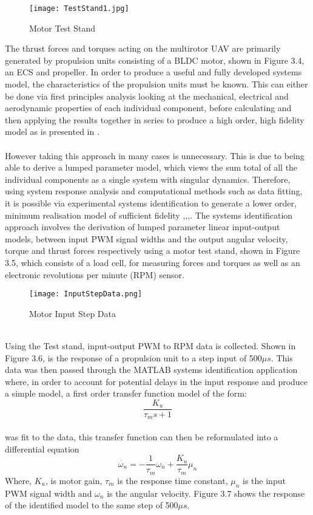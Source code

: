 \documentclass[12pt,a4paper,twoside]{report}
\begin{document}
			\begin{figure}[h!]
				\centering
				\texttt{[image: TestStand1.jpg]}
				\caption{Motor Test Stand}
				\label{fig:motorteststand}
			\end{figure}
				
			The thrust forces and torques acting on the multirotor UAV are primarily generated by propulsion units consisting of a BLDC motor, shown in Figure 3.4, an ECS and propeller. In order to produce a useful and fully developed systems model, the characteristics of the propulsion units must be known. This can either be done via first principles analysis looking at the mechanical, electrical and aerodynamic properties of each individual component, before calculating and then applying the results together in series to produce a high order, high fidelity model as is presented in \cite{17}. 
			\\ \\
			However taking this approach in many cases is unnecessary. This is due to being able to derive a lumped parameter model, which views the sum total of all the individual components as a single system with singular dynamics. Therefore, using system response analysis and computational methods such as data fitting, it is possible via experimental systems identification to generate a lower order, minimum realisation model of sufficient fidelity \cite{9},\cite{12},\cite{15},\cite{16}. The systems identification approach involves the derivation of lumped parameter linear input-output models, between input PWM signal widths and the output angular velocity, torque and thrust forces respectively using a motor test stand, shown in Figure 3.5, which consists of a load cell, for measuring forces and torques as well as an electronic revolutions per minute (RPM) sensor.
			\\
			\begin{figure}[h!]
				\centering
				\texttt{[image: InputStepData.png]}
				\caption{Motor Input Step Data}
				\label{fig:inputstepdata}
			\end{figure}
			\\
			Using the Test stand, input-output PWM to RPM data is collected. Shown in Figure 3.6, is the response of a propulsion unit to a step input of 500$\mu s$. This data was then passed through the MATLAB systems identification application where, in order to account for potential delays in the input response and produce a simple model, a first order transfer function model of the form:
			\\
			\[ \frac{K_u}{\tau_m s + 1} \]
			\\
			was fit to the data, this transfer function can then be reformulated into a differential equation
			\begin{equation}
				\dot{\omega_n} = -\frac{1}{\tau_m}\omega_n	 + \frac{K_u}{\tau_m}\mu_n
			\end{equation}
			Where, $K_u$, is motor gain, $\tau_m$ is the response time constant, $\mu_n$ is the input PWM signal width and $\omega_n$ is the angular velocity. Figure 3.7 shows the response of the identified model to the same step of 500$\mu s$.
			
\end{document}

